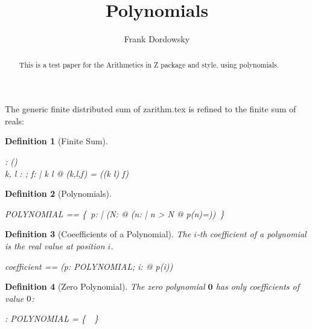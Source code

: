 \documentclass[12pt]{scrartcl}
\newtheorem{zdef}{Definition}[section]
\begin{document}
\title{Polynomials}
\author{Frank Dordowsky}

\maketitle

\begin{abstract}
  This is a test paper for the Arithmetics in Z package and style,
  using polynomials.
\end{abstract}



The generic finite distributed sum of zarithm.tex is refined to the
finite sum of reals:
\newcommand{\finsum}{\sum}
\begin{zdef}[Finite Sum]
  \label{zdef:finite-sum}
  \begin{axdef}
    \finsum : \nat \cross \nat \cross (\nat \fun \real) \fun \real \\
    \where
    \forall k, l : \nat; f: \nat \fun \real | k \leq l @
    \finsum(k,l,f) = \findistsum((k \upto l) \dres f)
  \end{axdef}
\end{zdef}


\begin{zdef}[Polynomials]
  \label{zdef:polynomials}
  \begin{zed}
    POLYNOMIAL == \{~p: \nat \fun \real | (\exists N: \nat @ (\forall n:
    \nat | n > N @ p(n)=\azero))~\}
  \end{zed}
\end{zdef}

\begin{zdef}[Coeefficients of a Polynomial]
  \label{zdef:coefficient}
  The $i$-th coefficient of a polynomial is the real value at position
  $i$. 
  \begin{zed}
    coefficient == (\lambda p: POLYNOMIAL; i: \nat @ p(i))
  \end{zed}
\end{zdef}

\newcommand{\zeropol}{\mathbf{0}}
\begin{zdef}[Zero Polynomial]
  \label{zdef:zero-polynomial}
  The \emph{zero polynomial} $\zeropol$ has only coefficients of value
  $0$:
  \begin{axdef}
    \zeropol : POLYNOMIAL
    \where
    \ran \zeropol = \{~\azero~\}
  \end{axdef}
\end{zdef}
\end{document}
